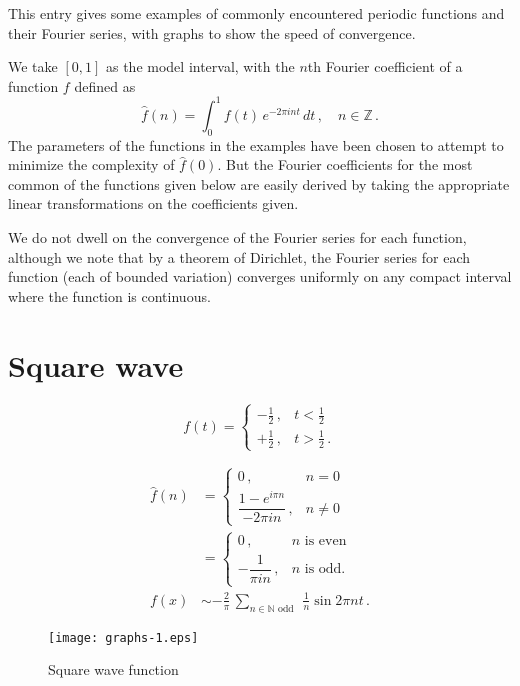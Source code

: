 \documentclass[12pt]{article}
\newcommand{\nat}{\mathbb{N}}
\newcommand{\intset}{\mathbb{Z}}
\begin{document}
This entry gives some examples of commonly encountered periodic functions
and their Fourier series, with graphs to show the speed of convergence.

We take $[0,1]$ as the model interval,
with the $n$th Fourier coefficient of a function $f$ defined as
\[
\widehat{f}(n) = \int_0^1 f(t) \, e^{-2\pi i n t} \, dt\,, \quad n \in \intset\,.
\]
The parameters of the functions in the examples 
have been chosen to attempt to minimize
the complexity of $\widehat{f}(0)$.  But the Fourier coefficients for
the most common  of the functions given below are easily derived
by taking the appropriate linear transformations on the coefficients given.

We do not dwell on the convergence of the Fourier series for each function,
although we note that by a theorem of Dirichlet, the Fourier series for each function (each of bounded variation) converges uniformly on any compact interval where the function is continuous.

\section{Square wave}
\[
f(t) = \begin{cases}
-\frac{1}{2}\,, & t < \frac{1}{2} \\
+\frac{1}{2}\,, & t > \frac{1}{2}\,.
\end{cases}
\]

\begin{makeimage}
\begin{align*}
\widehat{f}(n) &=
\begin{cases}
0\,, & n = 0\\
\dfrac{1 - e^{i\pi n}}{-2 \pi i n}\,, & n \neq 0
\end{cases} \\
&=
 \begin{cases}
0\,, & \text{$n$ is even} \\
-\dfrac{1}{\pi i n}\,, & \text{$n$ is odd.}
\end{cases} \\
f(x) &\sim - \frac{2}{\pi} \, \sum_{n \in \nat \text{ odd }} \, \frac{1}{n} \sin 2\pi n t\,.
\end{align*}
\end{makeimage}

\begin{figure}[!htb]
\begin{center}
\texttt{[image: graphs-1.eps]}
\end{center}
\caption{Square wave function}
\end{figure}
\end{document}
